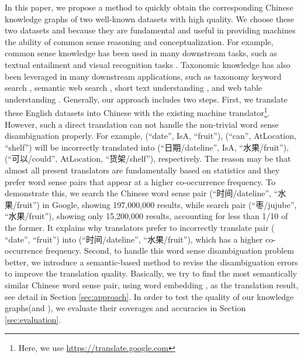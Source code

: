 In this paper, we propose a method to quickly obtain the corresponding Chinese knowledge 
graphs of two well-known datasets with high quality.  
We choose these two datasets \con and \pro because they are 
fundamental and useful in providing machines the ability of common sense reasoning 
and conceptualization. 
For example, common sense knowledge has been used in many downstream tasks, such as textual entailment \cite{dagan2010recognizing,bowman2015large} and visual recognition tasks \cite{zhu2014reasoning}.
Taxonomic knowledge has also been leveraged in many downstream applications, 
such as taxonomy keyword search \cite{ding2012optimizing}, 
semantic web search \cite{wang2010toward}, 
short text understanding \cite{song2011short}, 
and web table understanding \cite{wang2012understanding}.  
Generally, our approach includes two steps. 
First, we translate these English datasets into Chinese with the existing machine translator\footnote{Here, we use \url{https://translate.google.com}}.  
However, such a direct translation can not handle the non-trivial word sense disambiguation properly. 
For example, (``date'', IsA, ``fruit''), (``can'', AtLocation, ``shelf'') will be 
incorrectly translated into (``日期/dateline'', IsA, ``水果/fruit''), 
(``可以/could'', AtLocation, ``货架/shelf''), respectively. 
The reason may be that almost all present translators are fundamentally based on statistics and they prefer word sense pairs that appear at a higher co-occurrence frequency.
To demonstrate this, we search the Chinese word sense pair (``时间/dateline'', ``水果/fruit'') in Google, showing 197,000,000 results, while search pair (``枣/jujube'', ``水果/fruit''), showing only 15,200,000 results, accounting for less than 1/10 of the former. 
It explains why translators prefer to incorrectly translate pair ( ``date'', ``fruit'') into (``时间/dateline'', ``水果/fruit''), which has a higher co-occurrence frequency.
Second, to handle this word sense disambiguation problem better, 
we introduce a semantic-based method to revise the disambiguation errors to improve the translation quality.
Basically, we try to find the most semantically similar Chinese word sense pair, 
using word embedding \cite{Mikolov_nips_2013}, as the translation result, see detail in Section \ref{sec:approach}. 
In order to test the quality of our knowledge graphs(\zhcon and \zhpro), we evaluate their coverages and accuracies in Section \ref{sec:evaluation}.